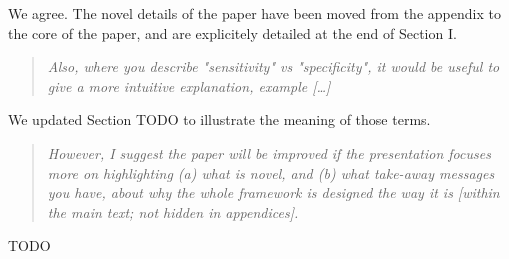 \documentclass[a4paper]{article}
\begin{document}
We agree. The novel details of the paper have been moved from the appendix to the core of the paper, and are explicitely detailed at the end of Section I.

\begin{quote}  \textit{
Also, where you describe "sensitivity" vs "specificity", it would be
useful to give a more intuitive explanation, example [\dots]}
\end{quote}
We updated Section TODO to illustrate the meaning of those terms.

\begin{quote}  \textit{
However, I suggest the paper will be improved if
the presentation focuses more on highlighting (a) what is novel, and
(b)
what take-away messages you have, about why the whole framework is
designed the way it is [within the main text; not hidden in
appendices].}
\end{quote}

TODO



\end{document}
